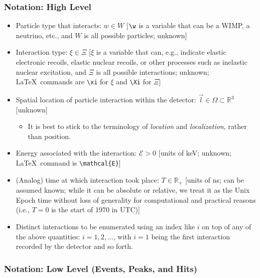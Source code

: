 \documentclass[]{article}
\providecommand{\tightlist}{%
  \setlength{\itemsep}{0pt}\setlength{\parskip}{0pt}}
\begin{document}
\subsubsection{Notation: High Level}

\begin{itemize}
\tightlist
\item
  Particle type that interacts:
  \(w \in W\)
  {[}\(\w\) is a variable that can be a WIMP, a neutrino, etc., and \(W\) is all possible particles; unknown{]} 

\item
  Interaction type:
  \(\xi \in \Xi\)
  {[}\(\xi\) is a variable that can, e.g., indicate elastic electronic recoils, elastic nuclear recoils, or other processes such as inelastic nuclear excitation, and \(\Xi\) is all possible interactions; unknown; {\color{blue}\LaTeX~commands are \verb|\xi| for $\xi$ and \verb|\Xi| for $\Xi$}{]}

\item
  Spatial location of particle interaction within the detector:
  \(\vec{l} \in \Omega \subset \mathbb{R}^3\) {[}unknown{]}

  \begin{itemize}
  \tightlist
  \item
    It is best to stick to the terminology of \emph{location} and \emph{localization}, rather than position.
  \end{itemize}
\item
  Energy associated with the interaction: \(\mathcal{E} > 0\)
  {[}units of keV; unknown; \LaTeX~command is \verb|\mathcal{E}|{]}
\item
  (Analog) time at which interaction took place: \(T \in \mathbb{R}_+\)
  {[}units of ns; can be assumed known; while it can be absolute or relative, we treat it as the Unix Epoch time without loss of generality for computational and practical reasons (i.e., \(T=0\) is the start of 1970 in UTC){]}
\item
  Distinct interactions to be enumerated using an index like \(i\) on top of any of the above quantities: \(i = 1,2,\dots\), with \(i = 1\) being the first interaction recorded by the detector and so forth.
\end{itemize}

\subsubsection{Notation: Low Level (Events, Peaks, and Hits)}
\end{document}
